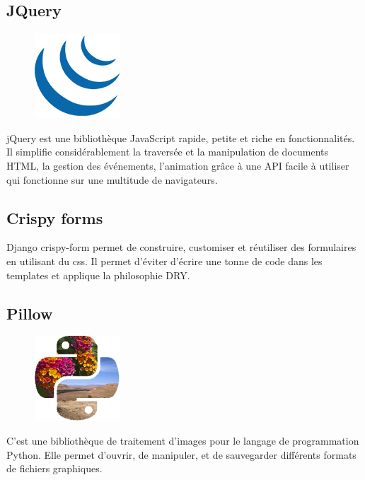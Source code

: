     \subsection{JQuery}
            \begin{figure}
                \vspace{-22pt}
              \begin{center}
                 \includegraphics[scale=0.36]{images/logo/jquery.png}
                 \label{fig79}
              \end{center}
              \vspace{-20pt}
              \vspace{-10pt}
            \end{figure}
        jQuery est une bibliothèque JavaScript rapide, petite et riche en fonctionnalités. Il simplifie considérablement la traversée et la manipulation de documents HTML, la gestion des événements, l'animation grâce à une API facile à utiliser qui fonctionne sur une multitude de navigateurs\cite{23}.
        
    \subsection{Crispy forms}
        Django crispy-form permet de construire, customiser et réutiliser des formulaires en utilisant du css. Il permet d'éviter d'écrire une tonne de code dans les templates et applique la philosophie DRY\cite{24}.
    
    \subsection{Pillow}
            \begin{figure}
                \vspace{-22pt}
              \begin{center}
                 \includegraphics[scale=0.36]{images/logo/pillow.png}
                 \label{fig80}
              \end{center}
              \vspace{-20pt}
              \vspace{-10pt}
            \end{figure}
        C’est une bibliothèque de traitement d'images pour le langage de programmation Python. Elle permet d'ouvrir, de manipuler, et de sauvegarder différents formats de fichiers graphiques\cite{25}.
    
